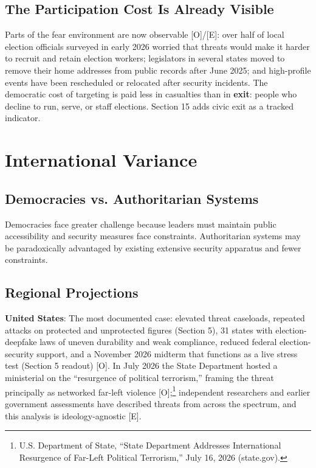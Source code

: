 \documentclass[11pt,letterpaper]{article}
\begin{document}
\subsection{The Participation Cost Is Already Visible}

Parts of the fear environment are now observable [O]/[E]: over half of local election officials surveyed in early 2026 worried that threats would make it harder to recruit and retain election workers; legislators in several states moved to remove their home addresses from public records after June 2025; and high-profile events have been rescheduled or relocated after security incidents. The democratic cost of targeting is paid less in casualties than in \textbf{exit}: people who decline to run, serve, or staff elections. Section 15 adds civic exit as a tracked indicator.

\section{International Variance}

\subsection{Democracies vs. Authoritarian Systems}

Democracies face greater challenge because leaders must maintain public accessibility and security measures face constraints. Authoritarian systems may be paradoxically advantaged by existing extensive security apparatus and fewer constraints.

\subsection{Regional Projections}

\textbf{United States}: The most documented case: elevated threat caseloads, repeated attacks on protected and unprotected figures (Section 5), 31 states with election-deepfake laws of uneven durability and weak compliance, reduced federal election-security support, and a November 2026 midterm that functions as a live stress test (Section 5 readout) [O]. In July 2026 the State Department hosted a ministerial on the ``resurgence of political terrorism,'' framing the threat principally as networked far-left violence [O];\footnote{U.S. Department of State, ``State Department Addresses International Resurgence of Far-Left Political Terrorism,'' July 16, 2026 (state.gov).} independent researchers and earlier government assessments have described threats from across the spectrum, and this analysis is ideology-agnostic [E].
\end{document}
